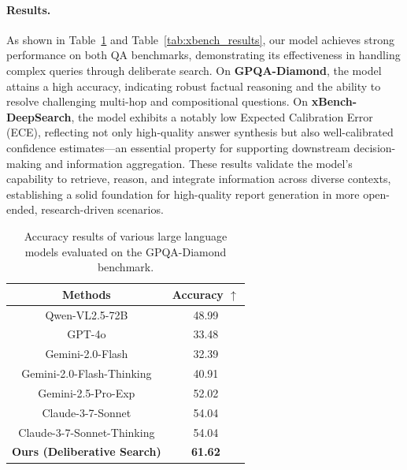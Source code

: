 \documentclass[11pt]{article}
\begin{document}
\paragraph{Results.}  
As shown in Table~\ref{tab:gpqa_results} and Table~\ref{tab:xbench_results}, our model achieves strong performance on both QA benchmarks, demonstrating its effectiveness in handling complex queries through deliberate search. On \textbf{GPQA-Diamond}, the model attains a high accuracy, indicating robust factual reasoning and the ability to resolve challenging multi-hop and compositional questions. On \textbf{xBench-DeepSearch}, the model exhibits a notably low Expected Calibration Error (ECE), reflecting not only high-quality answer synthesis but also well-calibrated confidence estimates—an essential property for supporting downstream decision-making and information aggregation. These results validate the model's capability to retrieve, reason, and integrate information across diverse contexts, establishing a solid foundation for high-quality report generation in more open-ended, research-driven scenarios.

\begin{table}[ht]
    \small
    \centering
    \begin{tabular}{c|c}
        \toprule[1pt]\midrule
        \textbf{Methods} & \textbf{Accuracy} $\uparrow$ \\
        \midrule
        Qwen-VL2.5-72B & 48.99 \\
        GPT-4o & 33.48 \\
        Gemini-2.0-Flash & 32.39 \\
        Gemini-2.0-Flash-Thinking & 40.91 \\
        Gemini-2.5-Pro-Exp & 52.02 \\
        Claude-3-7-Sonnet & 54.04 \\
        Claude-3-7-Sonnet-Thinking & 54.04 \\
        \rowcolor[gray]{0.9}
        \textbf{Ours (Deliberative Search)} & \textbf{61.62} \\
        \midrule\bottomrule[1pt]
    \end{tabular}
    \caption{Accuracy results of various large language models evaluated on the GPQA-Diamond benchmark.}
    \label{tab:gpqa_results}
\end{table}
\end{document}
